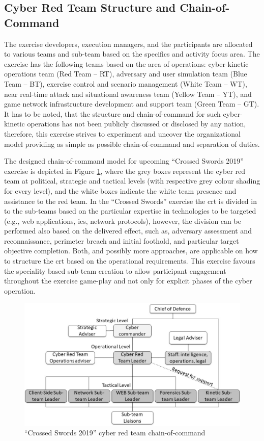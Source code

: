 \subsection{Cyber Red Team Structure and Chain-of-Command}
\label{sec:command}
The exercise developers, execution managers, and the participants are allocated to various teams and sub-team based on the specifics and activity focus area.
The exercise has the following teams based on the area of operations: cyber-kinetic operations team (Red Team -- RT), adversary and user simulation team (Blue Team -- BT), exercise control and scenario management (White Team -- WT), near real-time attack and situational awareness team (Yellow Team -- YT), and game network infrastructure development and support team (Green Team -- GT). It has to be noted, that the structure and chain-of-command for such cyber-kinetic operations has not been publicly discussed or disclosed by any nation, therefore, this exercise strives to experiment and uncover the organizational model providing as simple as possible chain-of-command and separation of duties.

The designed chain-of-command model for upcoming ``Crossed Swords 2019'' exercise is depicted in Figure \ref{fig:rtorg}, where the grey boxes represent the cyber red team at political, strategic and tactical levels (with respective grey colour shading for every level), and the white boxes indicate the white team presence and assistance to the red team.
In the ``Crossed Swords'' exercise the \gls{crt} is divided in to the sub-teams based on the particular expertise in technologies to be targeted (e.g., web applications, \gls{ics}, network protocols), however, the division can be performed also based on the delivered effect, such as, adversary assessment and reconnaissance, perimeter breach and initial foothold, and particular target objective completion. Both, and possibly more approaches, are applicable on how to structure the \gls{crt} based on the operational requirements. This exercise favours the speciality based sub-team creation to allow participant engagement throughout the exercise game-play and not only for explicit phases of the cyber operation.

\begin{figure}[!tb]
    \centering
    \includegraphics[width=1.0\textwidth]{./img/rt-org.jpg}
    \caption{``Crossed Swords 2019'' cyber red team chain-of-command}
    \label{fig:rtorg}
\end{figure}

